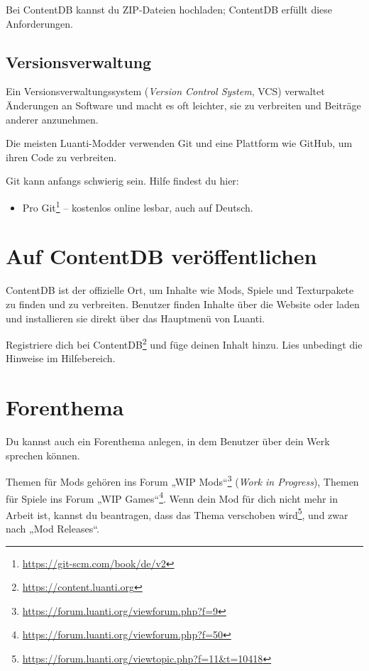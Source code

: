 Bei ContentDB kannst du ZIP-Dateien
hochladen; ContentDB erfüllt diese Anforderungen.

\subsection{Versionsverwaltung}\label{versionsverwaltung}

Ein Versionsverwaltungssystem (\emph{Version Control System}, VCS)
verwaltet Änderungen an Software und macht es oft leichter, sie zu
verbreiten und Beiträge anderer anzunehmen.

Die meisten Luanti-Modder verwenden Git und eine Plattform wie GitHub,
um ihren Code zu verbreiten.

Git kann anfangs schwierig sein. Hilfe findest du hier:

\begin{itemize}
\tightlist
\item
  Pro Git\footnote{\url{https://git-scm.com/book/de/v2}} -- kostenlos
  online lesbar, auch auf Deutsch.
\end{itemize}

\section{Auf ContentDB
veröffentlichen}\label{auf-contentdb-veruxf6ffentlichen}

ContentDB ist der offizielle Ort, um Inhalte wie Mods, Spiele und
Texturpakete zu finden und zu verbreiten. Benutzer finden Inhalte über
die Website oder laden und installieren sie direkt über das Hauptmenü
von Luanti.

Registriere dich bei ContentDB\footnote{\url{https://content.luanti.org}}
und füge deinen Inhalt hinzu. Lies unbedingt die Hinweise im
Hilfebereich.

\section{Forenthema}\label{forenthema}

Du kannst auch ein Forenthema anlegen, in dem Benutzer über dein Werk
sprechen können.

Themen für Mods gehören ins Forum „WIP Mods``\footnote{\url{https://forum.luanti.org/viewforum.php?f=9}}
(\emph{Work in Progress}), Themen für Spiele ins Forum „WIP
Games``\footnote{\url{https://forum.luanti.org/viewforum.php?f=50}}.
Wenn dein Mod für dich nicht mehr in Arbeit ist, kannst du beantragen,
dass das Thema verschoben wird\footnote{\url{https://forum.luanti.org/viewtopic.php?f=11&t=10418}},
und zwar nach „Mod Releases``.

